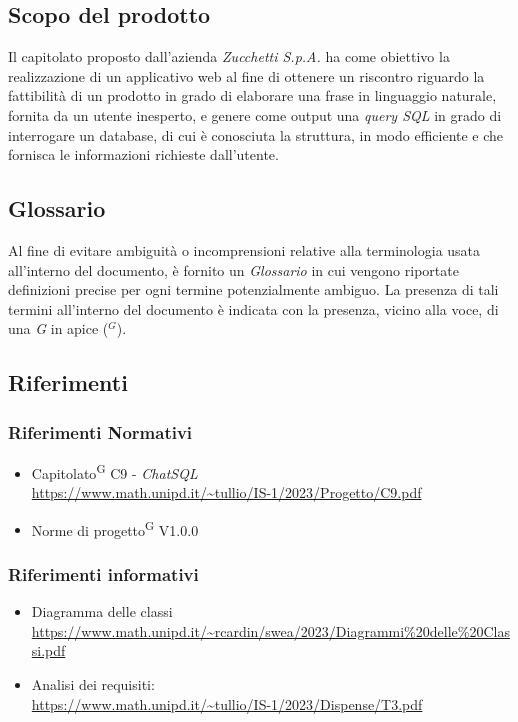 \documentclass[5pt]{article}
\begin{document}
	\subsection{Scopo del prodotto}
     Il capitolato proposto dall'azienda \textit{Zucchetti S.p.A.} ha come obiettivo la realizzazione di un applicativo web al fine di ottenere un riscontro riguardo la fattibilità di un prodotto in grado di elaborare una frase in linguaggio naturale, fornita da un utente inesperto, e genere come output una \textit{query SQL} in grado di interrogare un database, di cui è conosciuta la struttura, in modo efficiente e che fornisca le informazioni richieste dall'utente.

        \subsection{Glossario}
     Al fine di evitare ambiguità o incomprensioni relative alla terminologia usata all'interno del documento, è fornito un \textit{Glossario} in cui vengono riportate definizioni precise per ogni termine potenzialmente ambiguo. La presenza di tali termini all'interno del documento è indicata con la presenza, vicino alla voce, di una \textit{G} in apice ($^G$). 

        \subsection{Riferimenti}
        
        \subsubsection{Riferimenti Normativi}
        \begin{itemize}
		\item Capitolato\textsuperscript{G} C9 - \textit{ChatSQL} \\ \url{https://www.math.unipd.it/~tullio/IS-1/2023/Progetto/C9.pdf} 
		\item Norme di progetto\textsuperscript{G} V1.0.0
        \end{itemize}
        
        \subsubsection{Riferimenti informativi}
        \begin{itemize}
         \item Diagramma delle classi \\ \url{https://www.math.unipd.it/~rcardin/swea/2023/Diagrammi%20delle%20Classi.pdf}
         \item Analisi dei requisiti: \\
         \url{https://www.math.unipd.it/~tullio/IS-1/2023/Dispense/T3.pdf}\\
        \end{itemize}
        
\end{document}
